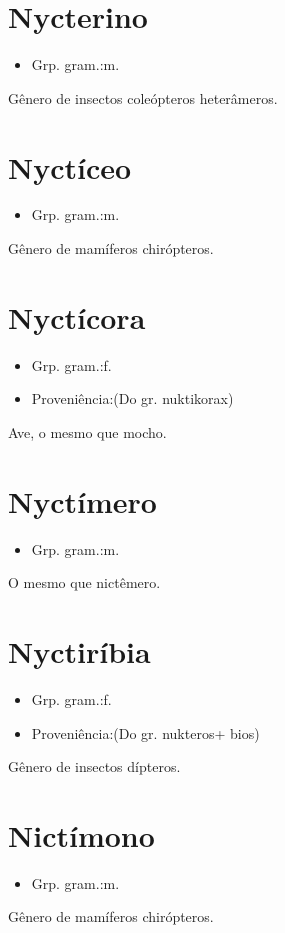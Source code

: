 \section{Nycterino}
\begin{itemize}
\item {Grp. gram.:m.}
\end{itemize}
Gênero de insectos coleópteros heterâmeros.
\section{Nyctíceo}
\begin{itemize}
\item {Grp. gram.:m.}
\end{itemize}
Gênero de mamíferos chirópteros.
\section{Nyctícora}
\begin{itemize}
\item {Grp. gram.:f.}
\end{itemize}
\begin{itemize}
\item {Proveniência:(Do gr. \textunderscore nuktikorax\textunderscore )}
\end{itemize}
Ave, o mesmo que \textunderscore mocho\textunderscore .
\section{Nyctímero}
\begin{itemize}
\item {Grp. gram.:m.}
\end{itemize}
O mesmo que \textunderscore nictêmero\textunderscore .
\section{Nyctiríbia}
\begin{itemize}
\item {Grp. gram.:f.}
\end{itemize}
\begin{itemize}
\item {Proveniência:(Do gr. \textunderscore nukteros\textunderscore  + \textunderscore bios\textunderscore )}
\end{itemize}
Gênero de insectos dípteros.
\section{Nictímono}
\begin{itemize}
\item {Grp. gram.:m.}
\end{itemize}
Gênero de mamíferos chirópteros.
